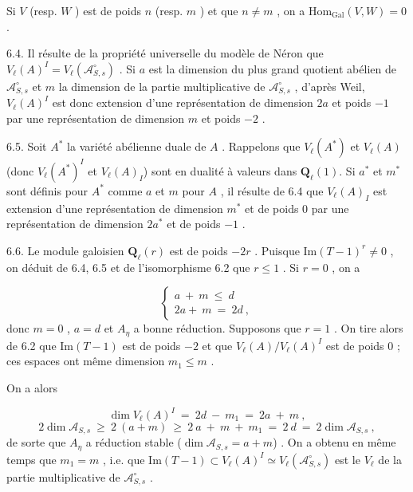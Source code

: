 
Si $V$ (resp. $W$ ) est de poids $n$ (resp. $m$ ) et que $n \neq m$ , on a $\mathrm{Hom}_{\mathrm{Gal}}(V,W) = 0$ .

6.4. Il résulte de la propriété universelle du modèle de Néron que $V_{\ell}(A)^{I} = V_{\ell}(\mathcal{A}^{\circ}_{S,s})$ . Si $a$ est la dimension du plus grand quotient abélien de $\mathcal{A}^{\circ}_{S,s}$ et $m$ la dimension de la partie multiplicative de $\mathcal{A}^{\circ}_{S,s}$ , d'après Weil, $V_{\ell}(A)^{I}$ est donc extension d'une représentation de dimension $2a$ et poids $-1$ par une représentation de dimension $m$ et poids $-2$ .

6.5. Soit $A^{*}$ la variété abélienne duale de $A$ . Rappelons que $V_{\ell}(A^{*})$ et $V_{\ell}(A)$ (donc $V_{\ell}(A^{*})^{I}$ et $V_{\ell}(A)_{I}$) sont en dualité à valeurs dans $\mathbf{Q}_{\ell}(1)$. Si $a^{*}$ et $m^{*}$ sont définis pour $A^{*}$ comme $a$ et $m$ pour $A$ , il résulte de 6.4 que $V_{\ell}(A)_{I}$ est extension d'une représentation de dimension $m^{*}$ et de poids 0 par une représentation de dimension $2a^{*}$ et de poids $-1$ .

6.6. Le module galoisien $\mathbf{Q}_{\ell}(r)$ est de poids $-2r$ . Puisque $\mathrm{Im}(T-1)^{r} \neq 0$ , on déduit de 6.4, 6.5 et de l'isomorphisme 6.2 que $r \leqslant 1$ . Si $r = 0$ , on a

\begin{equation*}
\left\{
\begin{array}{l}
a \ + \ m \ \leqslant \ d \\[2ex]
2a + \ m \ = \ 2d \ ,
\end{array}
\right.
\end{equation*}
donc $m = 0$ , $a = d$ et $A_{\eta}$ a bonne réduction. Supposons que $r = 1$ . On tire alors de 6.2 que $\mathrm{Im}(T-1)$ est de poids $-2$ et que $V_{\ell}(A)/V_{\ell}(A)^{I}$ est de poids 0 ; ces espaces ont même dimension $m_{1} \leqslant m$ .

On a alors

\begin{equation*}
\dim V_{\ell}(A)^{I} \ = \ 2d \ - \ m_{1} \ = \ 2a \ + \ m \ ,
\end{equation*}
\begin{equation*}
2 \dim \mathcal{A}_{S,s} \ \geqslant \ 2 \ (a + m) \ \geqslant \ 2 \ a \ + \ m \ + \ m_{1} \ = \ 2 \ d \ = \ 2 \dim \mathcal{A}_{S,s} \ ,
\end{equation*}
de sorte que $A_{\eta}$ a réduction stable ($\dim \mathcal{A}_{S,s} = a + m$) . On a obtenu en même temps que $m_{1} = m$ , i.e. que $\mathrm{Im}(T-1) \subset V_{\ell}(A)^{I} \simeq V_{\ell}(\mathcal{A}^{\circ}_{S,s})$ est le $V_{\ell}$ de la partie multiplicative de $\mathcal{A}^{\circ}_{S,s}$ .


